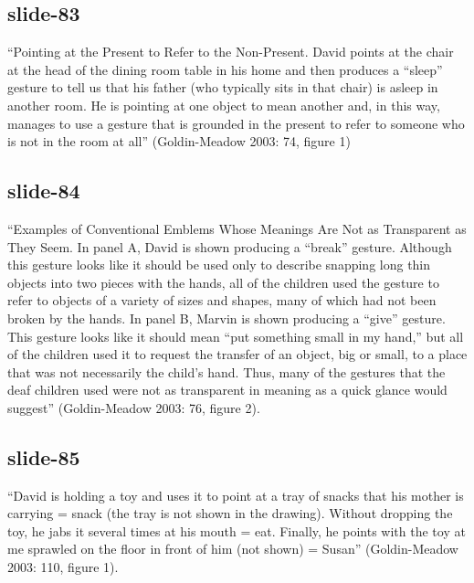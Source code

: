 \documentclass[12pt,\papersize]{extarticle}
\begin{document}
 
\subsection{slide-83}
“Pointing at the Present to Refer to the Non-Present. David points at the chair at the head of the dining room table in his home and then produces a “sleep” gesture to tell us that his father (who typically sits in that chair) is asleep in another room. He is pointing at one object to mean another and, in this way, manages to use a gesture that is grounded in the present to refer to someone who is not in the room at all” (Goldin-Meadow 2003: 74, figure 1)
 
 
\subsection{slide-84}
“Examples of Conventional Emblems Whose Meanings Are Not as Transparent as They Seem. In panel A, David is shown producing a “break” gesture. Although this gesture looks like it should be used only to describe snapping long thin objects into two pieces with the hands, all of the children used the gesture to refer to objects of a variety of sizes and shapes, many of which had not been broken by the hands. In panel B, Marvin is shown producing a “give” gesture. This gesture looks like it should mean “put something small in my hand,” but all of the children used it to request the transfer of an object, big or small, to a place that was not necessarily the child's hand. Thus, many of the gestures that the deaf children used were not as transparent in meaning as a quick glance would suggest” (Goldin-Meadow 2003: 76, figure 2).
 
 
\subsection{slide-85}
“David is holding a toy and uses it to point at a tray of snacks that his mother is carrying = snack (the tray is not shown in the drawing). Without dropping the toy, he jabs it several times at his mouth = eat. Finally, he points with the toy at me sprawled on the floor in front of him (not shown) = Susan” (Goldin-Meadow 2003: 110, figure 1).
 
 
\end{document}
